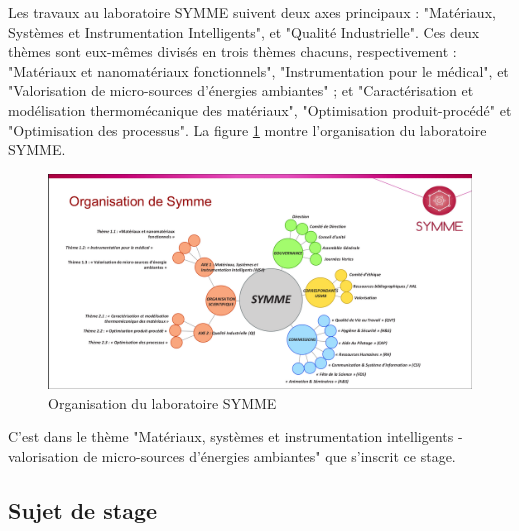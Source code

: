 \documentclass[a4paper, french, 12pt, titlepage]{article}
\begin{document}
Les travaux au laboratoire SYMME suivent deux axes principaux : "Matériaux, Systèmes et Instrumentation Intelligents", et "Qualité Industrielle".
Ces deux thèmes sont eux-mêmes divisés en trois thèmes chacuns, respectivement : "Matériaux et nanomatériaux fonctionnels", "Instrumentation pour le médical", et "Valorisation de micro-sources d'énergies ambiantes" ; et "Caractérisation et modélisation thermomécanique des matériaux", "Optimisation produit-procédé" et "Optimisation des processus".
La figure \ref{fig:fig1} montre l'organisation du laboratoire SYMME.

\begin{figure}[H]
  \includegraphics[width=\linewidth]{organigramme.png}
  \caption{Organisation du laboratoire SYMME}
  \label{fig:fig1}
\end{figure}


C'est dans le thème "Matériaux, systèmes et instrumentation intelligents - valorisation de micro-sources d'énergies ambiantes" que s'inscrit ce stage.

\subsection{Sujet de stage}
\end{document}
